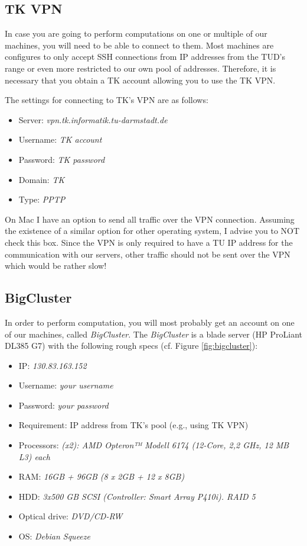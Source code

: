 \documentclass{article}
\begin{document}
\subsection{TK VPN}

In case you are going to perform computations on one or multiple of our machines, you will need to be able to connect to them.
Most machines are configures to only accept SSH connections from IP addresses from the TUD's range or even more restricted to our own pool of addresses.
Therefore, it is necessary that you obtain a TK account allowing you to use the TK VPN.

The settings for connecting to TK's VPN are as follows:

\begin{itemize}
	\item Server: \emph{vpn.tk.informatik.tu-darmstadt.de}
	\item Username: \emph{TK account}
	\item Password: \emph{TK password}
	\item Domain: \emph{TK}
	\item Type: \emph{PPTP}
\end{itemize}

On Mac I have an option to send all traffic over the VPN connection.
Assuming the existence of a similar option for other operating system, I advise you to NOT check this box.
Since the VPN is only required to have a TU IP address for the communication with our servers, other traffic should not be sent over the VPN which would be rather slow!




\subsection{BigCluster}

In order to perform computation, you will most probably get an account on one of our machines, called \emph{BigCluster}.
The \emph{BigCluster} is a blade server (HP ProLiant DL385 G7) with the following rough specs (cf. Figure \ref{fig:bigcluster}):

\begin{itemize}
	\item IP: \emph{130.83.163.152}
	\item Username: \emph{your username}
	\item Password: \emph{your password}
	\item Requirement: IP address from TK's pool (e.g., using TK VPN)
	\item Processors: \emph{(x2): AMD Opteron™ Modell 6174 (12-Core, 2,2 GHz, 12 MB L3) each}
	\item RAM: \emph{16GB + 96GB (8 x 2GB + 12 x 8GB)}
	\item HDD: \emph{3x500 GB SCSI (Controller: Smart Array P410i). RAID 5}
	\item Optical drive: \emph{DVD/CD-RW}
	\item OS: \emph{Debian Squeeze}
\end{itemize}
\end{document}
